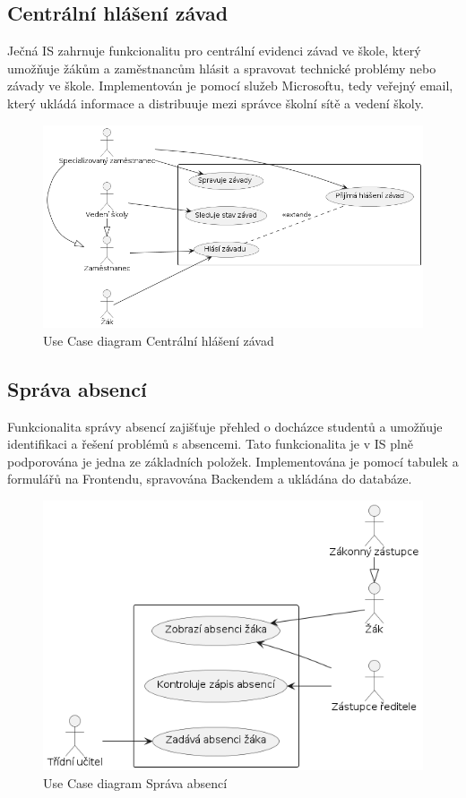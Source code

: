 \documentclass[FM,Proj]{tulthesis}
\begin{document}
\subsection*{Centrální hlášení závad}
Ječná IS zahrnuje funkcionalitu pro centrální evidenci závad ve škole, který umožňuje
žákům a zaměstnancům hlásit a spravovat technické problémy nebo závady ve škole.
Implementován je pomocí služeb Microsoftu, tedy veřejný email, který ukládá informace
a distribuuje mezi správce školní sítě a vedení školy.

\begin{figure}[H]
    \includegraphics[width=\textwidth-28pt]{uc-centralni-hlaseni-zavad.png}
    \caption{Use Case diagram Centrální hlášení závad}
    \label{fig:uc-centralni-hlaseni-zavad}
\end{figure}

\subsection*{Správa absencí}
Funkcionalita správy absencí zajišťuje přehled o docházce studentů a umožňuje identifikaci
a řešení problémů s absencemi. Tato funkcionalita je v IS plně podporována je jedna ze 
základních položek. Implementována je pomocí tabulek a formulářů na Frontendu, spravována 
Backendem a ukládána do databáze.

\begin{figure}[H]
    \includegraphics[width=\textwidth-28pt]{uc-sprava-absenci.png}
    \caption{Use Case diagram Správa absencí}
    \label{fig:uc-sprava-absenci}
\end{figure}
\end{document}
